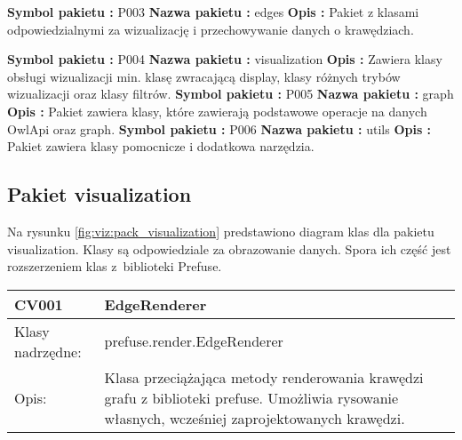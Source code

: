 \noindent 
{\bf Symbol pakietu :} P003 \newline
{\bf Nazwa pakietu :} edges \newline
{\bf Opis :} Pakiet z klasami odpowiedzialnymi za wizualizację i przechowywanie danych o krawędziach. \newline

\noindent 
{\bf Symbol pakietu :} P004 \newline
{\bf Nazwa pakietu :} visualization \newline
{\bf Opis :} Zawiera klasy obsługi wizualizacji min. klasę zwracającą display, klasy różnych trybów wizualizacji oraz klasy filtrów. \newline
\newline
\noindent 
{\bf Symbol pakietu :} P005 \newline
{\bf Nazwa pakietu :} graph \newline
{\bf Opis :} Pakiet zawiera klasy, które zawierają podstawowe operacje na danych OwlApi oraz graph. \newline
\newline
\noindent 
{\bf Symbol pakietu :} P006 \newline
{\bf Nazwa pakietu :} utils \newline
{\bf Opis :}  Pakiet zawiera klasy pomocnicze i dodatkowa narzędzia. \newline


\subsection*{Pakiet visualization}


Na rysunku  \figurename \space \ref{fig:viz:pack_visualization}  predstawiono diagram klas dla pakietu visualization. Klasy są odpowiedziale za obrazowanie danych. Spora ich część jest rozszerzeniem klas 
z~biblioteki Prefuse. 


 

\begin{longtable}{|m{3.5cm}|m{8.5cm}|} \hline

CV001 & EdgeRenderer \\ \hline
Klasy nadrzędne: &  prefuse.render.EdgeRenderer   \\ \hline
Opis: & Klasa przeciążająca metody renderowania krawędzi grafu z biblioteki prefuse. Umożliwia rysowanie własnych, wcześniej zaprojektowanych krawędzi. \\ \hline

\end{longtable}


